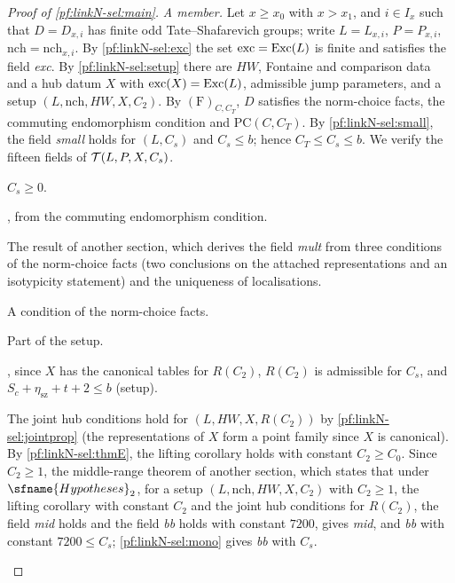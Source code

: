 \begin{proof}[Proof of \cref{pf:linkN-sel:main}]
\emph{A member.} Let $x\ge x_0$ with $x>x_1$, and $i\in I_x$ such that $D=D_{x,i}$ has finite odd Tate--Shafarevich groups; write $L=L_{x,i}$,
$P=P_{x,i}$, $\mathrm{nch}=\mathrm{nch}_{x,i}$. By \cref{pf:linkN-sel:exc} the set $\mathrm{exc}=\mathrm{Exc}(L)$ is finite and satisfies the field
\emph{exc}. By \cref{pf:linkN-sel:setup} there are $HW$, Fontaine and comparison data and a hub datum $X$ with $\mathrm{exc}(X)=\mathrm{Exc}(L)$,
admissible jump parameters, and a setup $(L,\mathrm{nch},HW,X,C_2)$. By $(\mathrm F)_{C,C_T}$, $D$ satisfies the norm-choice facts, the commuting
endomorphism condition and $\mathrm{PC}(C,C_T)$. By \cref{pf:linkN-sel:small}, the field \emph{small} holds for $(L,C_s)$ and $C_s\le b$; hence
$C_T\le C_s\le b$. We verify the fifteen fields of $\mathcal T(L,P,X,C_s)$.
\begin{description}[style=nextline,leftmargin=1.5em,font=\normalfont\itshape]
\item[pos] $C_s\ge0$.
\item[pass] , from the commuting endomorphism condition.
\item[mult] The result  of another section, which derives the field \emph{mult} from three
conditions of the norm-choice facts (two conclusions on the attached representations and an isotypicity statement) and the uniqueness of
localisations.
\item[rank] A condition of the norm-choice facts.
\item[kill] Part of the setup.
\item[num] , since $X$ has the canonical tables for $R(C_2)$, $R(C_2)$ is admissible for $C_s$, and
$S_c+\eta_{\mathrm{sz}}+t+2\le b$ (setup).
\item[mid, bb] The joint hub conditions hold for $(L,HW,X,R(C_2))$ by \cref{pf:linkN-sel:jointprop} (the representations of $X$ form a point family
since $X$ is canonical). By \cref{pf:linkN-sel:thmE}, the lifting corollary holds with constant $C_2\ge C_0$. Since $C_2\ge1$, the middle-range
theorem  of another section, which states that under $\sfname{Hypotheses}_2$, for a setup
$(L,\mathrm{nch},HW,X,C_2)$ with $C_2\ge1$, the lifting corollary with constant $C_2$ and the joint hub conditions for $R(C_2)$, the field \emph{mid}
holds and the field \emph{bb} holds with constant $7200$, gives \emph{mid}, and \emph{bb} with constant $7200\le C_s$; \cref{pf:linkN-sel:mono}
gives \emph{bb} with $C_s$.

\end{description}
\end{proof}

